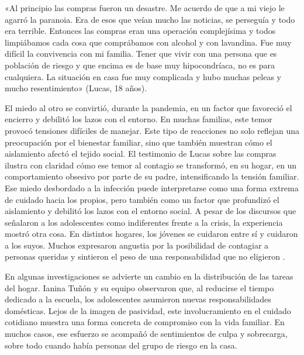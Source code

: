 \begin{refsection}
\begin{gbcita}
«Al principio las compras fueron un desastre. Me acuerdo de que a mi viejo le agarró la paranoia. Era de esos que veían mucho las noticias, se perseguía y todo era terrible. Entonces las compras eran una operación complejísima y todos limpiábamos cada cosa que comprábamos con alcohol y con lavandina. Fue muy difícil la convivencia con mi familia. Tener que vivir con una persona que es población de riesgo y que encima es de base muy hipocondríaca, no es para cualquiera. La situación en casa fue muy complicada y hubo muchas peleas y mucho resentimiento» (Lucas, 18 años).

\end{gbcita}

El miedo al otro se convirtió, durante la pandemia, en un factor que favoreció el encierro y debilitó los lazos con el entorno. En muchas familias, este temor provocó tensiones difíciles de manejar. Este tipo de reacciones no solo reflejan una preocupación por el bienestar familiar, sino que también muestran cómo el aislamiento afectó el tejido social. El testimonio de Lucas sobre las compras ilustra con claridad cómo ese temor al contagio se transformó, en su hogar, en un comportamiento obsesivo por parte de su padre, intensificando la tensión familiar. Ese miedo desbordado a la infección puede interpretarse como una forma extrema de cuidado hacia los propios, pero también como un factor que profundizó el aislamiento y debilitó los lazos con el entorno social. A pesar de los discursos que señalaron a los adolescentes como indiferentes frente a la crisis, la experiencia mostró otra cosa. En distintos hogares, los jóvenes se cuidaron entre sí y cuidaron a los suyos. Muchos expresaron angustia por la posibilidad de contagiar a personas queridas y sintieron el peso de una responsabilidad que no eligieron \protect\parencite{4233-MOGUILLANSKY2022}.

En algunas investigaciones se advierte un cambio en la distribución de las tareas del hogar. Ianina Tuñón y su equipo \protect\parencite*{4231-TUNON2021} observaron que, al reducirse el tiempo dedicado a la escuela, los adolescentes asumieron nuevas responsabilidades domésticas. Lejos de la imagen de pasividad, este involucramiento en el cuidado cotidiano muestra una forma concreta de compromiso con la vida familiar. En muchos casos, ese esfuerzo se acompañó de sentimientos de culpa y sobrecarga, sobre todo cuando había personas del grupo de riesgo en la casa.



\end{refsection}

